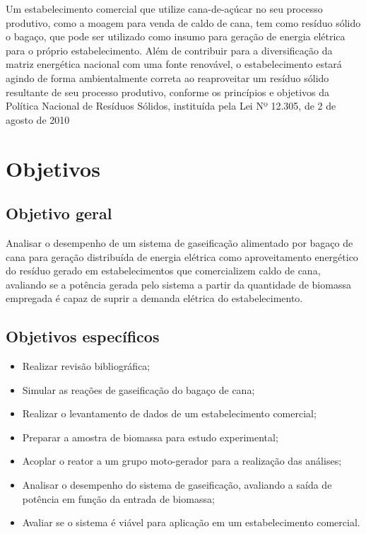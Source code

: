 Um estabelecimento comercial que utilize cana-de-açúcar no seu processo produtivo, como a moagem para venda de caldo de cana, tem como resíduo sólido o bagaço, que pode ser utilizado como insumo para geração de energia elétrica para o próprio estabelecimento.  Além de contribuir para a diversificação da matriz energética nacional com uma fonte renovável, o estabelecimento estará agindo de forma ambientalmente correta ao reaproveitar um resíduo sólido resultante de seu processo produtivo, conforme os princípios e objetivos da Política Nacional de Resíduos Sólidos, instituída pela Lei Nº 12.305, de 2 de agosto de 2010 %

\section{Objetivos}
\subsection{Objetivo geral}
Analisar o desempenho de um sistema de gaseificação alimentado por bagaço de cana para geração distribuída de energia elétrica como aproveitamento energético do resíduo gerado em estabelecimentos que comercializem caldo de cana, avaliando se a potência gerada pelo sistema a partir da quantidade de biomassa empregada é capaz de suprir a demanda elétrica do estabelecimento.

\subsection{Objetivos específicos}
\begin{itemize}
\item Realizar revisão bibliográfica;	

\item Simular as reações de gaseificação do bagaço de cana;

\item Realizar o levantamento de dados de um estabelecimento comercial;

\item Preparar a amostra de biomassa para estudo experimental;

\item Acoplar o reator a um grupo moto-gerador para a realização das análises;

\item Analisar o desempenho do sistema de gaseificação, avaliando a saída de potência em função da entrada de biomassa;

\item Avaliar se o sistema é viável para aplicação em um estabelecimento comercial.
\end{itemize}



